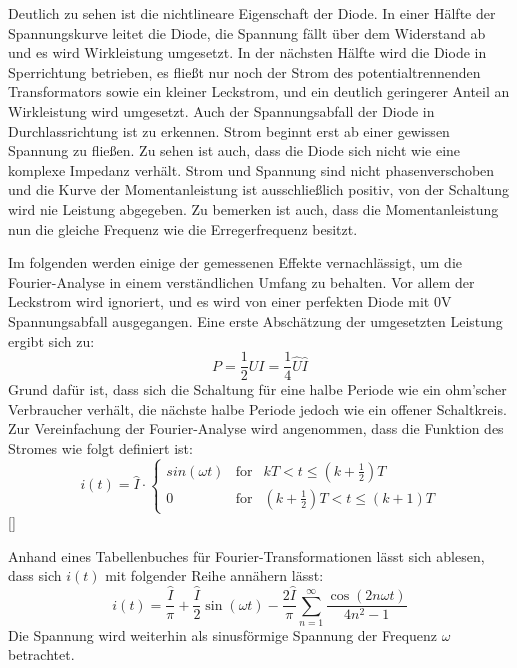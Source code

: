 Deutlich zu sehen ist die nichtlineare Eigenschaft der Diode. In einer Hälfte der Spannungskurve leitet die Diode, die Spannung fällt über dem Widerstand ab und es wird Wirkleistung umgesetzt. In der nächsten Hälfte wird die Diode in Sperrichtung betrieben, es fließt nur noch der Strom des potentialtrennenden Transformators sowie ein kleiner Leckstrom, und ein deutlich geringerer Anteil an Wirkleistung wird umgesetzt. Auch der Spannungsabfall der Diode in Durchlassrichtung ist zu erkennen. Strom beginnt erst ab einer gewissen Spannung zu fließen.
Zu sehen ist auch, dass die Diode sich nicht wie eine komplexe Impedanz verhält. Strom und Spannung sind nicht phasenverschoben und die Kurve der Momentanleistung ist ausschließlich positiv, von der Schaltung wird nie Leistung abgegeben. Zu bemerken ist auch, dass die Momentanleistung nun die gleiche Frequenz wie die Erregerfrequenz besitzt.

Im folgenden werden einige der gemessenen Effekte vernachlässigt, um die Fourier-Analyse in einem verständlichen Umfang zu behalten. Vor allem der Leckstrom wird ignoriert, und es wird von einer perfekten Diode mit 0V Spannungsabfall ausgegangen. 
Eine erste Abschätzung der umgesetzten Leistung ergibt sich zu:
\begin{equation}
P = \frac{1}{2} UI = \frac{1}{4}\hat{U}\hat{I}
\end{equation}
Grund dafür ist, dass sich die Schaltung für eine halbe Periode wie ein ohm'scher Verbraucher verhält, die nächste halbe Periode jedoch wie ein offener Schaltkreis.
Zur Vereinfachung der Fourier-Analyse wird angenommen, dass die Funktion des Stromes wie folgt definiert ist:
\begin{equation}
i(t)=\hat{I}\cdot \left\{ 
\begin{array}{ccr}
	sin(\omega t) & \mbox{for} & kT < t \leq (k+\frac{1}{2})T \\
	0 & \mbox{for} & (k+\frac{1}{2})T < t \leq (k+1)T
\end{array}
\right.
\end{equation}
[\cite{calpolyFourier}]

Anhand eines Tabellenbuches für Fourier-Transformationen lässt sich ablesen, dass sich $i(t)$ mit folgender Reihe annähern lässt:
\begin{equation}
i(t) = \frac{\hat{I}}{\pi} + \frac{\hat{I}}{2}\sin(\omega t) - \frac{2\hat{I}}{\pi}\sum_{n=1}^{\infty}\frac{\cos(2n\omega t)}{4n^2 - 1}
\end{equation}
Die Spannung wird weiterhin als sinusförmige Spannung der Frequenz $\omega$ betrachtet.

